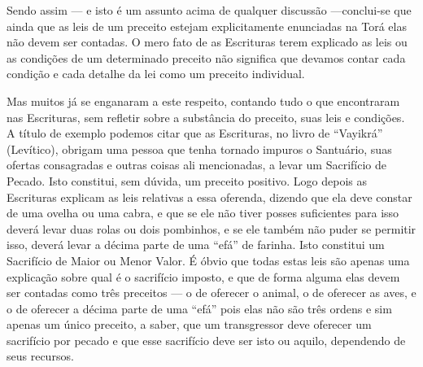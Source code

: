 Sendo assim --- e isto é um assunto acima de qualquer discussão
---conclui-se que ainda que as leis de um preceito estejam
explicitamente enunciadas na Torá elas não devem ser contadas. O mero
fato de as Escrituras terem explicado as leis ou as condições de um
determinado preceito não significa que devamos contar cada condição e
cada detalhe da lei como um preceito individual.

Mas muitos já se enganaram a este respeito, contando tudo o que
encontraram nas Escrituras, sem refletir sobre a substância do preceito,
suas leis e condições. A título de exemplo podemos citar que as
Escrituras, no livro de ``Vayikrá'' (Levítico), obrigam uma pessoa que
tenha tornado impuros o Santuário, suas ofertas consagradas e outras
coisas ali mencionadas, a levar um Sacrifício de Pecado. Isto
constitui, sem dúvida, um preceito positivo. Logo depois as Escrituras
explicam as leis relativas a essa oferenda, dizendo que ela deve
constar de uma ovelha ou uma cabra, e que se ele não tiver posses
suficientes para isso deverá levar duas rolas ou dois pombinhos, e se
ele também não puder se permitir isso, deverá levar a décima parte de
uma ``efá'' de farinha. Isto constitui um Sacrifício de Maior ou Menor
Valor. É óbvio que todas estas leis são apenas uma explicação sobre qual
é o sacrifício imposto, e que de forma alguma elas devem ser contadas
como três preceitos --- o de oferecer o animal, o de oferecer as aves,
e o de oferecer a décima parte de uma ``efá'' pois elas não são três
ordens e sim apenas um único preceito, a saber, que um transgressor deve
oferecer um sacrifício por pecado e que esse sacrifício deve ser isto ou
aquilo, dependendo de seus recursos.

